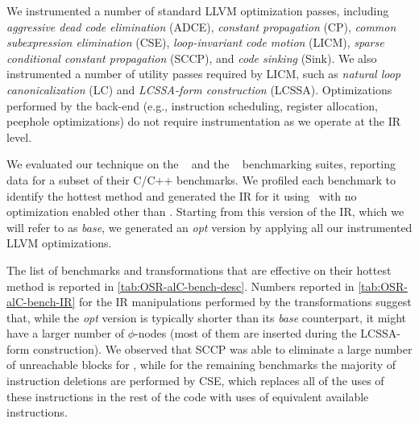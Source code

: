 \noindent We instrumented a number of standard LLVM optimization passes, including {\em aggressive dead code elimination} (ADCE), {\em constant propagation} (CP), {\em common subexpression elimination} (CSE), {\em loop-invariant code motion} (LICM), {\em sparse conditional constant propagation} (SCCP), and {\em code sinking} (Sink). We also instrumented a number of utility passes required by LICM, such as {\em natural loop canonicalization} (LC) and {\em LCSSA-form construction} (LCSSA). Optimizations performed by the back-end (e.g., instruction scheduling, register allocation, peephole optimizations) do not require instrumentation as we operate at the IR level.

We evaluated our technique on the \speccpu~\cite{Henning06} and the \phoronixpts~\cite{Phoronix} benchmarking suites, reporting data for a subset of their C/C++ benchmarks. We profiled each benchmark to identify the hottest method and generated the IR for it using \clang\ with no optimization enabled other than \memtoreg. Starting from this version of the IR, which we will refer to as {\em base}, we generated an {\em opt} version by applying all our instrumented LLVM optimizations.

The list of benchmarks and transformations that are effective on their hottest method is reported in \mytable\ref{tab:OSR-alC-bench-desc}. Numbers reported in \mytable\ref{tab:OSR-alC-bench-IR} for the IR manipulations performed by the transformations suggest that, while the {\em opt} version is typically shorter than its {\em base} counterpart, it might have a larger number of $\phi$-nodes (most of them are inserted during the LCSSA-form construction). We observed that SCCP was able to eliminate a large number of unreachable blocks for , while for the remaining benchmarks the majority of instruction deletions are performed by CSE, which replaces all of the uses of these instructions in the rest of the code with uses of equivalent available instructions.

